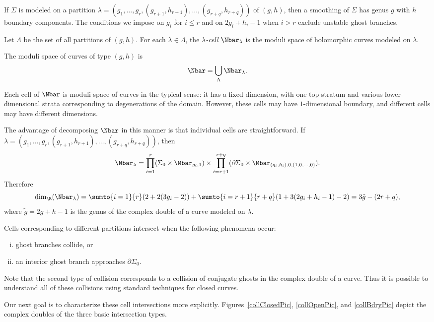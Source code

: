 \begin{remark}
If $\Sigma$ is modeled on a partition $\lambda=(g_1,\ldots,g_r,(g_{r+1},h_{r+1}),\ldots,(g_{r+q},h_{r+q}))$ of $(g,h)$, then a smoothing of $\Sigma$ has genus $g$ with $h$ boundary components. The conditions we impose on $g_i$ for $i \leq r$ and on $2g_i+h_i-1$ when $i>r$ exclude unstable ghost branches.
\end{remark}

\begin{definition}
Let $\Lambda$ be the set of all partitions of $(g,h)$. For each $\lambda \in \Lambda$, the \emph{$\lambda$-cell} $\Nbar_\lambda$ is the moduli space of holomorphic curves modeled on $\lambda$. 

The moduli space of curves of type $(g,h)$ is
\[
\Nbar = \bigcup\limits_\Lambda \Nbar_\lambda.
\]
\end{definition}

Each cell of $\Nbar$ is moduli space of curves in the typical sense: it has a fixed dimension, with one top stratum and various lower-dimensional strata corresponding to degenerations of the domain. However, these cells may have $1$-dimensional boundary, and different cells may have different dimensions.

The advantage of decomposing $\Nbar$ in this manner is that individual cells are straightforward. If $\lambda=(g_1,\ldots,g_r,(g_{r+1},h_{r+1}),\ldots,(g_{r+q},h_{r+q}))$, then
\[
\Nbar_\lambda = \prod\limits_{i=1}^{r} (\Sigma_0 \times \Mbar_{g_i,1}) \times \prod\limits_{i=r+1}^{r+q} (\partial\Sigma_0\times\Mbar_{(g_i,h_i),0,(1,0,\ldots,0)}).
\]
Therefore
\[
\dim_\R(\Nbar_\lambda) = \sumto{i=1}{r} (2+2(3g_i-2)) + \sumto{i=r+1}{r+q} (1+3(2g_i+h_i-1)-2) = 3\tilde{g}-(2r+q),
\]
where $\tilde{g}=2g+h-1$ is the genus of the complex double of a curve modeled on $\lambda$.

Cells corresponding to different partitions intersect when the following phenomena occur:
\begin{enumerate}[(i)]
\item ghost branches collide, or
\item an interior ghost branch approaches $\partial\Sigma_0$.
\end{enumerate}
Note that the second type of collision corresponds to a collision of conjugate ghosts in the complex double of a curve. Thus it is possible to understand all of these collisions using standard techniques for closed curves.

Our next goal is to characterize these cell intersections more explicitly. Figures~\ref{collClosedPic}, \ref{collOpenPic}, and \ref{collBdryPic} depict the complex doubles of the three basic intersection types.

